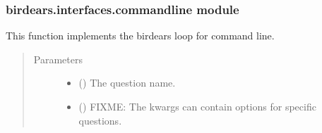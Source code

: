 \documentclass[letterpaper,10pt,english]{sphinxmanual}
\begin{document}
\subsubsection{birdears.interfaces.commandline module}
\label{\detokenize{birdears.interfaces:birdears-interfaces-commandline-module}}\label{\detokenize{birdears.interfaces:module-birdears.interfaces.commandline}}

\begin{fulllineitems}
\label{\detokenize{birdears.interfaces:birdears.interfaces.commandline.CommandLine}}
This function implements the birdears loop for command line.
\begin{quote}\begin{description}
\item[{Parameters}] \leavevmode\begin{itemize}
\item {} 
 () \textendash{} The question name.

\item {} 
 () \textendash{} FIXME: The kwargs can contain options for specific
questions.

\end{itemize}

\end{description}\end{quote}

\end{fulllineitems}

\end{document}
